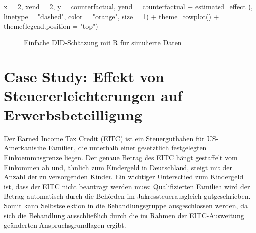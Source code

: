 \documentclass[
  a4paper,
  DIV=11,
  oneside]{scrreprt}
\newenvironment{Shaded}{\begin{snugshade}}{\end{snugshade}}
\newcommand{\AttributeTok}[1]{\textcolor[rgb]{0.40,0.45,0.13}{#1}}
\newcommand{\DecValTok}[1]{\textcolor[rgb]{0.68,0.00,0.00}{#1}}
\newcommand{\FunctionTok}[1]{\textcolor[rgb]{0.28,0.35,0.67}{#1}}
\newcommand{\NormalTok}[1]{\textcolor[rgb]{0.00,0.23,0.31}{#1}}
\newcommand{\SpecialCharTok}[1]{\textcolor[rgb]{0.37,0.37,0.37}{#1}}
\newcommand{\StringTok}[1]{\textcolor[rgb]{0.13,0.47,0.30}{#1}}
\begin{document}
\begin{Shaded}
\begin{Highlighting}[]
      \AttributeTok{x =} \DecValTok{2}\NormalTok{, }
      \AttributeTok{xend =} \DecValTok{2}\NormalTok{, }
      \AttributeTok{y =}\NormalTok{ counterfactual,}
      \AttributeTok{yend =}\NormalTok{ counterfactual }\SpecialCharTok{+}\NormalTok{ estimated\_effect}
\NormalTok{    ),}
    \AttributeTok{linetype =} \StringTok{"dashed"}\NormalTok{, }
    \AttributeTok{color =} \StringTok{"orange"}\NormalTok{, }
    \AttributeTok{size =} \DecValTok{1}\NormalTok{) }\SpecialCharTok{+}
  \FunctionTok{theme\_cowplot}\NormalTok{() }\SpecialCharTok{+}
  \FunctionTok{theme}\NormalTok{(}\AttributeTok{legend.position =} \StringTok{"top"}\NormalTok{)}
\end{Highlighting}
\end{Shaded}

\begin{figure}[t]


\caption{\label{fig-DIDSIMB}Einfache DID-Schätzung mit R für simulierte
Daten}

\end{figure}%

\section{Case Study: Effekt von Steuererleichterungen auf
Erwerbsbeteilligung}\label{case-study-effekt-von-steuererleichterungen-auf-erwerbsbeteilligung}

Der
\href{https://www.irs.gov/credits-deductions/individuals/earned-income-tax-credit-eitc}{Earned
Income Tax Credit} (EITC) ist ein Steuerguthaben für US-Amerkanische
Familien, die unterhalb einer gesetztlich festgelegten Einkoemmnsgrenze
liegen. Der genaue Betrag des EITC hängt gestaffelt vom Einkommen ab
und, ähnlich zum Kindergeld in Deutschland, steigt mit der Anzahl der zu
versorgenden Kinder. Ein wichtiger Unterschied zum Kindergeld ist, dass
der EITC nicht beantragt werden muss: Qualifizierten Familien wird der
Betrag automatisch durch die Behörden im Jahressteuerausgleich
gutgeschrieben. Somit kann Selbstselektion in die Behandlungsgruppe
ausgeschlossen werden, da sich die Behandlung ausschließlich durch die
im Rahmen der EITC-Ausweitung geänderten Anspruchsgrundlagen ergibt.
\end{document}
